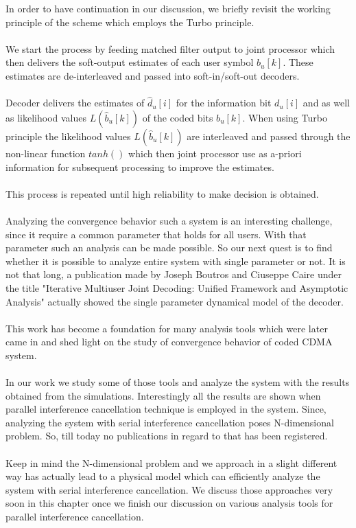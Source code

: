 In order to have continuation in our discussion, we briefly revisit the working principle of the scheme which employs the Turbo principle.\\ \\
We start the process by feeding matched filter output to joint processor which then delivers the soft-output estimates of each user symbol $b_u[k]$. These estimates are de-interleaved and passed into soft-in/soft-out decoders. \\ \\
Decoder delivers the estimates of $\hat{d}_u[i]$ for the information bit $d_u[i]$ and as well as likelihood values $L(\hat{b}_u[k])$ of the coded bits $b_u[k]$. When using Turbo principle the likelihood values $L(\hat{b}_u[k])$ are interleaved and passed through the non-linear function $tanh()$ which then joint processor use as a-priori information for subsequent processing to improve the estimates.\\ \\ This process is repeated until high reliability to make decision is obtained.\\ \\
Analyzing the convergence behavior such a system is an interesting challenge, since it require a common parameter that holds for all users. With that parameter such an analysis can be made possible. So our next quest is to find whether it is possible to analyze entire system with single parameter or not. It is not that long, a publication made by Joseph Boutros and Ciuseppe Caire under the title "Iterative Multiuser Joint Decoding: Unified Framework and Asymptotic Analysis" actually showed the single parameter dynamical model of the decoder. \\ \\
This work has become a foundation for many analysis tools which were later came in and shed light on the study of convergence behavior of coded CDMA system.\\ \\
In our work we study some of those tools and analyze the system with the results obtained from the simulations. Interestingly all the results are shown when parallel interference cancellation technique is employed in the system. Since, analyzing the system with serial interference cancellation poses N-dimensional problem. So, till today no publications in regard to that has been registered. \\ \\
Keep in mind the N-dimensional problem and we approach in a slight different way has actually lead to a physical model which can efficiently analyze the system with serial interference cancellation. We discuss those approaches very soon in this chapter once we finish our discussion on various analysis tools for parallel interference cancellation. \\ \\
